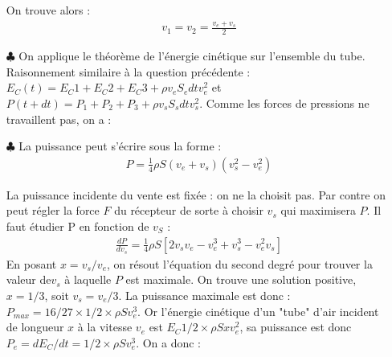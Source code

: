 \documentclass{report}
\begin{document}
\begin{itemize}
	On trouve alors :
	\begin{align*}
		v_1=v_2=\frac{v_e+v_s}{2}
	\end{align*}
	
	\item[$\clubsuit$] On applique le théorème de l'énergie cinétique sur l'ensemble du tube. Raisonnement similaire à la question précédente : $E_C(t)=E_C1+E_C2+E_C3+\rho v_e S_e dtv_e^2$ et $P(t+dt)=P_1+P_2+P_3+\rho v_s S_s dtv_s^2$. Comme les forces de pressions ne travaillent pas, on a :
	
	\noindent{}
	
	\item[$\clubsuit$] La puissance peut s'écrire sous la forme :
	\begin{align*}
		P=\frac{1}{4}\rho S(v_e+v_s)(v_s^2-v_e^2)
	\end{align*}	

	La puissance incidente du vente est fixée : on ne la choisit pas. Par contre on peut régler la force $F$ du récepteur de sorte 	à choisir $v_s$ qui maximisera $P$. Il faut étudier P en fonction de $v_S$ :
	\begin{align*}
		\frac{dP}{dv_s}=\frac{1}{4}\rho S\left[2v_sv_e-v_e^3+v_s^3-v_e^2v_s \right] 
	\end{align*}
	En posant $x=v_s/v_e$, on résout l'équation du second degré pour trouver la valeur de$v_s$ à laquelle $P$ est maximale. On trouve une solution positive, $x=1/3$, soit $v_s=v_e/3$.
	La puissance maximale est donc : $P_{max}=16/27\times1/2\times\rho Sv_e^3 $. Or l'énergie cinétique d'un "tube" d'air incident de longueur $x$ à la vitesse $v_e$ est $E_C1/2\times\rho Sxv_e^2$, sa puissance est donc $P_e=dE_C/dt=1/2\times\rho Sv_e^3$. On a donc :
	
	\noindent{}
	
\end{itemize}
\end{document}
